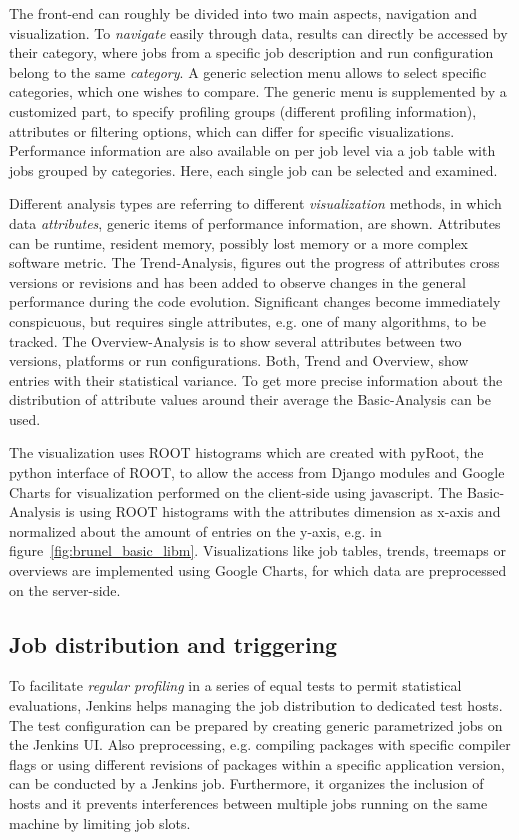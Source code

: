 \documentclass[a4paper]{jpconf}
\begin{document}
The front-end can roughly be divided into two main aspects, navigation and visualization. To \textit{navigate} easily through data, results can directly be accessed by their category, where jobs from a specific job description and run configuration belong to the same \textit{category}. A generic selection menu allows to select specific categories, which one wishes to compare. The generic menu is supplemented by a customized part, to specify profiling groups (different profiling information), attributes or filtering options, which can differ for specific visualizations. Performance information are also available on per job level via a job table with jobs grouped by categories. Here, each single job can be selected and examined.

Different analysis types are referring to different \textit{visualization} methods, in which data \textit{attributes}, generic items of performance information, are shown. Attributes can be runtime, resident memory, possibly lost memory or a more complex software metric. The Trend-Analysis, figures out the progress of attributes cross versions or revisions and has been added to observe changes in the general performance during the code evolution. Significant changes become immediately conspicuous, but requires single attributes, e.g. one of many algorithms, to be tracked. The Overview-Analysis is to show several attributes between two versions, platforms or run configurations. Both, Trend and Overview, show entries with their statistical variance. To get more precise information about the distribution of attribute values around their average the Basic-Analysis can be used.

The visualization uses ROOT histograms which are created with pyRoot, the python interface of ROOT, to allow the access from Django modules and Google Charts for visualization performed on the client-side using javascript. The Basic-Analysis is using ROOT histograms with the attributes dimension as x-axis and normalized about the amount of entries on the y-axis, e.g. in \mbox{figure \ref{fig:brunel_basic_libm}}. Visualizations like job tables, trends, treemaps or overviews are implemented using Google Charts, for which data are preprocessed on the server-side.

\subsection{Job distribution and triggering}
\label{sec:job_distribution}

To facilitate \textit{regular profiling} in a series of equal tests to permit statistical evaluations, Jenkins helps managing the job distribution to dedicated test hosts. The test configuration can be prepared by creating generic parametrized jobs on the Jenkins UI. Also preprocessing, e.g. compiling packages with specific compiler flags or using different revisions of packages within a specific application version, can be conducted by a Jenkins job. Furthermore, it organizes the inclusion of hosts and it prevents interferences between multiple jobs running on the same machine by limiting job slots.
\end{document}
